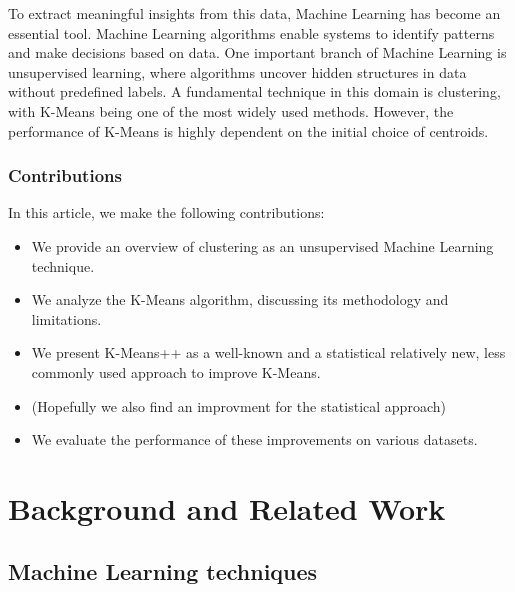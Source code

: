 \documentclass[10pt,twocolumn,letterpaper]{article}
\begin{document}
To extract meaningful insights from this data, Machine Learning has become an
essential tool. Machine Learning algorithms enable systems to identify patterns
and make decisions based on data. One important branch of Machine Learning is
unsupervised learning, where algorithms uncover hidden structures in data
without predefined labels. A fundamental technique in this domain is
clustering, with K-Means being one of the most widely used methods. However,
the performance of K-Means is highly dependent on the initial choice of
centroids.

\subsubsection{Contributions}

In this article, we make the following contributions:

\begin{itemize}
    \item We provide an overview of clustering as an unsupervised Machine Learning
          technique.
    \item We analyze the K-Means algorithm, discussing its methodology and limitations.
    \item We present K-Means++ as a well-known and a statistical relatively new, less
          commonly used approach to improve K-Means.
    \item (Hopefully we also find an improvment for the statistical approach)
    \item We evaluate the performance of these improvements on various datasets.
\end{itemize}


\section{Background and Related Work}\label{sec:background-and-related-work}


\subsection{Machine Learning techniques}\label{subsec:machine-learning-techniques}
\end{document}
